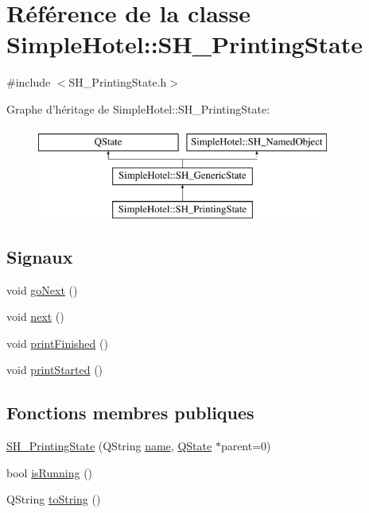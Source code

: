 \hypertarget{classSimpleHotel_1_1SH__PrintingState}{\section{Référence de la classe Simple\-Hotel\-:\-:S\-H\-\_\-\-Printing\-State}
\label{classSimpleHotel_1_1SH__PrintingState}
}


{\ttfamily \#include $<$S\-H\-\_\-\-Printing\-State.\-h$>$}

Graphe d'héritage de Simple\-Hotel\-:\-:S\-H\-\_\-\-Printing\-State\-:\begin{figure}[H]
\begin{center}
\leavevmode
\includegraphics[height=3.000000cm]{classSimpleHotel_1_1SH__PrintingState}
\end{center}
\end{figure}
\subsection*{Signaux}
\begin{DoxyCompactItemize}
\item 
void \hyperlink{classSimpleHotel_1_1SH__GenericState_a5afea8cc17017b08b8db6d51b5bcefc4}{go\-Next} ()
\item 
void \hyperlink{classSimpleHotel_1_1SH__GenericState_a0ff6668857baab63d4f13c4d7175acbd}{next} ()
\item 
void \hyperlink{classSimpleHotel_1_1SH__PrintingState_aab4f5083bc5194c67d53f3152c7c4019}{print\-Finished} ()
\item 
void \hyperlink{classSimpleHotel_1_1SH__PrintingState_aa90f1df3c6a6be4d5b92e69bfd601770}{print\-Started} ()
\end{DoxyCompactItemize}
\subsection*{Fonctions membres publiques}
\begin{DoxyCompactItemize}
\item 
\hyperlink{classSimpleHotel_1_1SH__PrintingState_a72e1348238810455da7e2991a33795f1}{S\-H\-\_\-\-Printing\-State} (Q\-String \hyperlink{classSimpleHotel_1_1SH__NamedObject_ad144716345034c91cface8f3163a799e}{name}, \hyperlink{classQState}{Q\-State} $\ast$parent=0)
\item 
bool \hyperlink{classSimpleHotel_1_1SH__GenericState_a5151ff071129bdd4dcf7c60cb93794da}{is\-Running} ()
\item 
Q\-String \hyperlink{classSimpleHotel_1_1SH__GenericState_adaded78178f9999a9e07a32871af5e61}{to\-String} ()
\end{DoxyCompactItemize}
